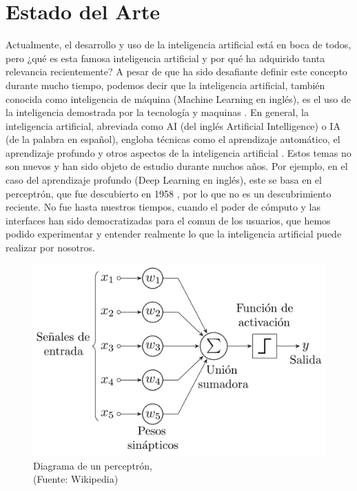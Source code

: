 
\chapter{Estado del Arte}


\par Actualmente, el desarrollo y uso de la inteligencia artificial está en boca de todos, pero ¿qué es esta famosa 
inteligencia artificial y por qué ha adquirido tanta relevancia recientemente? A pesar de que ha sido desafiante
definir este concepto durante mucho tiempo, podemos decir que la inteligencia artificial, también conocida 
como inteligencia de máquina (Machine Learning en inglés), es el uso de la inteligencia demostrada por la 
tecnología y maquinas \cite{mt1}. En general, la inteligencia artificial, abreviada como AI (del inglés Artificial Intelligence) 
o IA (de la palabra en español), engloba técnicas como el aprendizaje automático, el aprendizaje profundo y
otros aspectos de la inteligencia artificial \cite{mt1}. Estos temas no son nuevos y han sido objeto de estudio durante 
muchos años. Por ejemplo, en el caso del aprendizaje profundo (Deep Learning en inglés), este se basa en el 
perceptrón, que fue descubierto en 1958 \cite{perceptron}, por lo que no es un descubrimiento reciente. No fue hasta nuestros tiempos, cuando el poder de cómputo y las interfaces 
han sido democratizadas para el comun de los usuarios, que hemos podido experimentar y entender realmente lo que la 
inteligencia artificial puede realizar por nosotros.


\begin{figure}[ht!]
    \centering
    \includegraphics[width=.75\textwidth]{figures/ea1.png}
    \caption[Estructura del perceptrón]{Diagrama de un perceptrón,\\
    {\scriptsize (Fuente: Wikipedia)}}
    \label{fig:ea1}
\end{figure}

